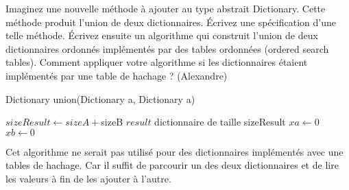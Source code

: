 Imaginez une nouvelle méthode à ajouter au type abstrait Dictionary. Cette méthode produit l’union de deux dictionnaires. Écrivez une spécification d’une telle méthode. Écrivez ensuite un algorithme qui construit l’union de deux dictionnaires ordonnés implémentés par des tables ordonnées (ordered search tables). Comment appliquer votre algorithme si les dictionnaires étaient implémentés par une table de hachage ? (Alexandre)

\begin{algorithm}
Dictionary union(Dictionary a, Dictionary a)
\end{algorithm}

\begin{algorithm}
\BlankLine
$sizeResult \longleftarrow sizeA + $sizeB\;
$result$ dictionnaire de taille sizeResult\;
$xa \gets 0$\;
$xb \gets 0$\;
\end{algorithm}

Cet algorithme ne serait pas utilisé pour des dictionnaires implémentés avec une tables de hachage. Car il suffit de parcourir un des deux dictionnaires et de lire les valeurs à fin de les ajouter à l'autre.

